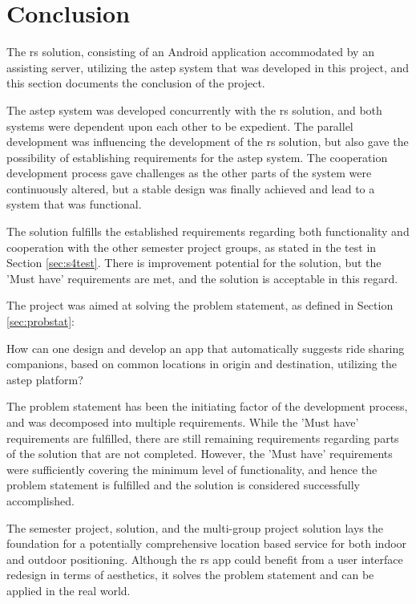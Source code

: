 \section{Conclusion}
The \gls{rs} solution, consisting of an Android application accommodated by an assisting server, utilizing the \gls{astep} system that was developed in this project, and this section documents the conclusion of the project.


The \gls{astep} system was developed concurrently with the \gls{rs} solution, and both systems were dependent upon each other to be expedient.
The parallel development was influencing the development of the \gls{rs} solution, but also gave the possibility of establishing requirements for the \gls{astep} system.
The cooperation development process gave challenges as the other parts of the system were continuously altered, but a stable design was finally achieved and lead to a system that was functional.


The solution fulfills the established requirements regarding both functionality and cooperation with the other semester project groups, as stated in the test in Section \ref{sec:s4test}.
There is improvement potential for the solution, but the 'Must have' requirements are met, and the solution is acceptable in this regard.


The project was aimed at solving the problem statement, as defined in Section \ref{sec:probstat}:

{\addtolength{\leftskip}{10mm}\addtolength{\rightskip}{10mm}\noindent\hrulefill\it
	
	\noindent How can one design and develop an app that automatically suggests ride sharing companions, based on common locations in origin and destination, utilizing the \gls{astep} platform? 
	
	\noindent\hrulefill
	
}


The problem statement has been the initiating factor of the development process, and was decomposed into multiple requirements.
While the 'Must have' requirements are fulfilled, there are still remaining requirements regarding parts of the solution that are not completed.
However, the 'Must have' requirements were sufficiently covering the minimum level of functionality, and hence the problem statement is fulfilled and the solution is considered successfully accomplished.


The semester project, solution, and the multi-group project solution lays the foundation for a potentially comprehensive location based service for both indoor and outdoor positioning.
Although the \gls{rs} app could benefit from a user interface redesign in terms of aesthetics, it solves the problem statement and can be applied in the real world.
